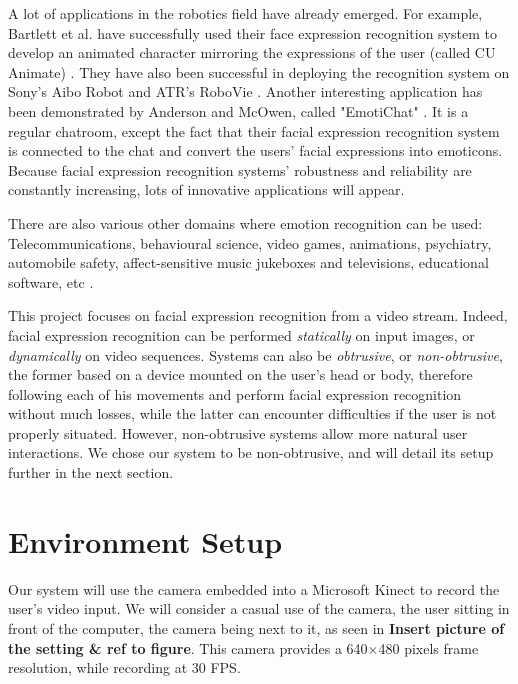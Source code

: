 \noindent A lot of applications in the robotics field have already emerged. For example, Bartlett et al. have successfully used their face expression recognition system to develop an animated character mirroring the expressions of the user (called CU Animate) \cite{BAR03}. They have also been successful in deploying the recognition system on Sony's Aibo Robot and ATR's RoboVie \cite{BAR03}. Another interesting application has been demonstrated by Anderson and McOwen, called "EmotiChat" \cite{AND06}. It is a regular chatroom, except the fact that their facial expression recognition system is connected to the chat and convert the users' facial expressions into emoticons. Because facial expression recognition systems' robustness and reliability are constantly increasing, lots of innovative applications will appear.
\newline

\noindent There are also various other domains where emotion recognition can be used: Telecommunications, behavioural science, video games, animations, psychiatry, automobile safety, affect-sensitive music jukeboxes and televisions, educational software, etc \cite{BET12}.
\newline

\noindent This project focuses on facial expression recognition from a video stream. Indeed, facial expression recognition can be performed \textit{statically} on input images, or \textit{dynamically} on video sequences. Systems can also be \textit{obtrusive}, or \textit{non-obtrusive}, the former based on a device mounted on the user's head or body, therefore following each of his movements and perform facial expression recognition without much losses, while the latter can encounter difficulties if the user is not properly situated. However, non-obtrusive systems allow more natural user interactions. We chose our system to be non-obtrusive, and will detail its setup further in the next section.
\newline

\section{Environment Setup}

\vspace{\baselineskip}
\noindent Our system will use the camera embedded into a Microsoft Kinect to record the user's video input. We will consider a casual use of the camera, the user sitting in front of the computer, the camera being next to it, as seen in \textbf{\color{red} Insert picture of the setting \& ref to figure}. This camera provides a 640$\times$480 pixels frame resolution, while recording at 30 FPS.
\newline

